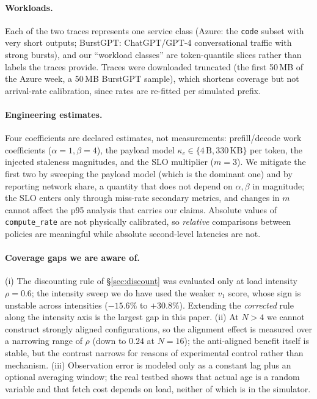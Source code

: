 \paragraph{Workloads.} Each of the two traces represents one service class (Azure: the
\texttt{code} subset with very short outputs; BurstGPT: ChatGPT/GPT-4 conversational traffic with
strong bursts), and our ``workload classes'' are token-quantile slices rather than labels the
traces provide. Traces were downloaded truncated (the first 50\,MB of the Azure week, a 50\,MB
BurstGPT sample), which shortens coverage but not arrival-rate calibration, since rates are
re-fitted per simulated prefix.

\paragraph{Engineering estimates.} Four coefficients are declared estimates, not measurements:
prefill/decode work coefficients ($\alpha=1,\beta=4$), the payload model
$\kappa_c\in\{4\,\text{B},330\,\text{KB}\}$ per token, the injected staleness magnitudes, and the
SLO multiplier ($m=3$). We mitigate the first two by sweeping the payload model (which is the
dominant one) and by reporting network share, a quantity that does not depend on $\alpha,\beta$
in magnitude; the SLO enters only through miss-rate secondary metrics, and changes in $m$ cannot
affect the p95 analysis that carries our claims. Absolute values of \texttt{compute\_rate} are
not physically calibrated, so \emph{relative} comparisons between policies are meaningful while
absolute second-level latencies are not.

\paragraph{Coverage gaps we are aware of.} (i) The discounting rule of \S\ref{sec:discount} was
evaluated only at load intensity $\rho=0.6$; the intensity sweep we do have used the weaker $v_1$
score, whose sign is unstable across intensities ($-15.6\%$ to $+30.8\%$). Extending the
\emph{corrected} rule along the intensity axis is the largest gap in this paper.
(ii) At $N>4$ we cannot construct strongly aligned configurations, so the alignment effect is
measured over a narrowing range of $\rho$ (down to $0.24$ at $N=16$); the anti-aligned benefit
itself is stable, but the contrast narrows for reasons of experimental control rather than
mechanism. (iii) Observation error is modeled only as a constant lag plus an optional averaging
window; the real testbed shows that actual age is a random variable and that fetch cost depends
on load, neither of which is in the simulator.

